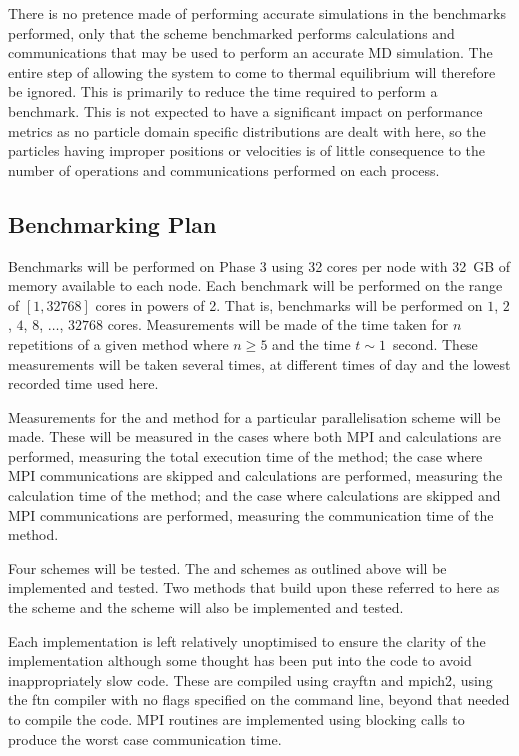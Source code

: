 %
There is no pretence made of performing accurate simulations in
the benchmarks performed,
only that the scheme benchmarked performs calculations and
communications that may be used to perform an accurate MD simulation.
%
The entire step of allowing the system to come to
thermal equilibrium will therefore be ignored.
%
This is primarily to reduce the time required to perform a benchmark.
%
This is not expected to have a significant impact on performance metrics
as no particle domain specific distributions are dealt with here,
so the particles having improper positions or velocities is of
little consequence to the number of operations and communications
performed on each process.


\subsection{Benchmarking Plan}

Benchmarks will be performed on \hector{} Phase 3 using
32 cores per node with 32~GB of memory available to each node.
%
Each benchmark will be performed on the range of $[1,32768]$ cores
in powers of 2.
%
That is, benchmarks will be performed on
$1$, $2$, $4$, $8$, $\dots{}$, $32768$ cores.
%
Measurements will be made of the time taken for $n$ repetitions of a given
method where $n \ge{} 5$ and the time $t \sim{} 1$~second.
%
These measurements will be taken several times, at different times of
day and the lowest recorded time used here.

Measurements for the \individualoperation{} and \pairoperation{} method
for a particular parallelisation scheme will be made.
%
These will be measured in the cases where both MPI and calculations
are performed, measuring the total execution time of the method;
the case where MPI communications are skipped and calculations are
performed, measuring the calculation time of the method; and
the case where calculations are skipped and MPI communications are
performed, measuring the communication time of the method.

Four schemes will be tested.
%
The \replicateddata{} and \systolicloop{} schemes as outlined above
will be implemented and tested.
%
Two methods that build upon these referred to here as
the \sharedandreplicateddata{} scheme and the \replicatedsystolicloop{} scheme
will also be implemented and tested.

Each implementation is left relatively unoptimised to ensure
the clarity of the implementation although
some thought has been put into the code to avoid inappropriately slow code.
%
These are compiled using crayftn and mpich2, using the ftn compiler with
no flags specified on the command line, beyond that needed to compile
the code.
%
MPI routines are implemented using blocking calls to produce the worst
case communication time.

